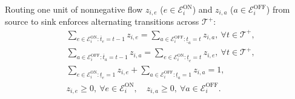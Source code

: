 \documentclass[journal]{IEEEtran}
\begin{document}
Routing one unit of nonnegative flow $z_{i,e}$ ($e\in\mathcal{E}_i^{\mathrm{ON}}$) and $z_{i,a}$ ($a\!\!\in\!\!\mathcal{E}_i^{\mathrm{OFF}}$) from source to sink enforces alternating transitions across $\mathcal{T}^{+}$:
\begin{subequations}\label{eq:flow}
\begin{align}
&\sum\nolimits_{e\in\mathcal{E}_i^{\mathrm{ON}}:\overline{t}_e=t-1} z_{i,e} \!=\! \sum\nolimits_{a\in\mathcal{E}_i^{\mathrm{OFF}}:\underline{t}_a=t} z_{i,a}, \ \forall t\!\!\in\!\!\mathcal{T}^{+},\label{eq:flow-on-off}\\
&\sum\nolimits_{a\in\mathcal{E}_i^{\mathrm{OFF}}:\overline{t}_a=t-1} z_{i,a} \!=\! \sum\nolimits_{e\in\mathcal{E}_i^{\mathrm{ON}}:\underline{t}_e=t} z_{i,e}, \ \forall t\!\!\in\!\!\mathcal{T}^{+},\label{eq:flow-off-on}\\
&\sum\nolimits_{e\in\mathcal{E}_i^{\mathrm{ON}}:\underline{t}_e=1} z_{i,e} + \sum\nolimits_{a\in\mathcal{E}_i^{\mathrm{OFF}}:\underline{t}_a=1} z_{i,a} = 1,\label{eq:flow-source}\\
&z_{i,e}\ge 0,\ \forall e\in\mathcal{E}_i^{\mathrm{ON}},\quad z_{i,a}\ge 0,\ \forall a\in\mathcal{E}_i^{\mathrm{OFF}}.
\end{align}
\end{subequations}
\end{document}
